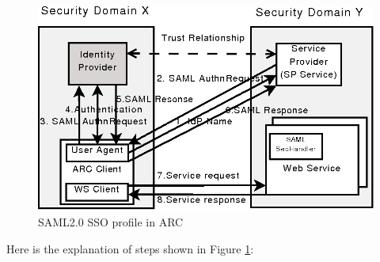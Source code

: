 \documentclass[twocolumn]{svjour3}         %
\begin{document}
\begin{figure}
\includegraphics[width=0.9\columnwidth]{SAML2SSO.png}
\caption{SAML2.0 SSO profile in ARC}
\label{fig:SAML2SSO}
\end{figure}
Here is the explanation of steps shown in Figure \ref{fig:SAML2SSO}:
\end{document}
